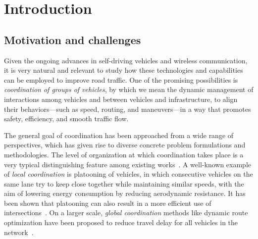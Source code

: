 \documentclass[a4paper]{report}
\theoremstyle{definition}
\theoremstyle{plain}
\begin{document}





\chapter{Introduction}

\section{Motivation and challenges}


%
Given the ongoing advances in self-driving vehicles and wireless communication,
it is very natural and relevant to study how these technologies and capabilities
can be employed to improve road traffic.
%
One of the promising possibilities is \emph{coordination of groups of vehicles},
by which we mean the dynamic management of interactions among vehicles and
between vehicles and infrastructure, to align their behaviors---such as speed,
routing, and maneuvers---in a way that promotes safety, efficiency, and smooth
traffic flow.

%
The general goal of coordination has been approached from a wide range of
perspectives, which has given rise to diverse concrete problem formulations and
methodologies.
%
The level of organization at which coordination takes place is a very typical
distinguishing feature among existing
works~\cite{marianiCoordinationAutonomousVehicles2022}.
%
A well-known example of \emph{local coordination} is platooning of vehicles, in
which consecutive vehicles on the same lane try to keep close together while
maintaining similar speeds, with the aim of lowering energy consumption by
reducing aerodynamic resistance. It has been shown that platooning can also
result in a more efficient use of
intersections~\cite{miculescuPollingsystemsbasedAutonomousVehicle2016,tachetRevisitingStreetIntersections2016,timmermanPlatoonFormingAlgorithms2021}.
On a larger scale, \emph{global coordination} methods like dynamic route
optimization have been proposed to reduce travel delay for all vehicles in the
network~\cite{rossiRoutingAutonomousVehicles2018}.
\end{document}
